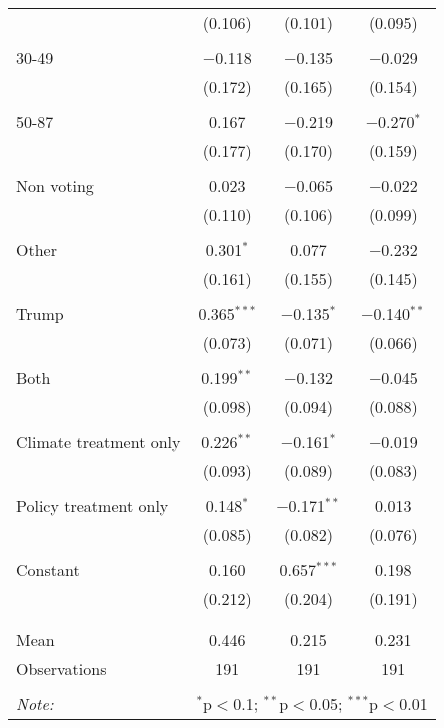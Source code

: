 \begin{tabular}{@{\extracolsep{5pt}}lccc}
  & (0.106) & (0.101) & (0.095) \\ 
  & & & \\ 
 30-49 & $-$0.118 & $-$0.135 & $-$0.029 \\ 
  & (0.172) & (0.165) & (0.154) \\ 
  & & & \\ 
 50-87 & 0.167 & $-$0.219 & $-$0.270$^{*}$ \\ 
  & (0.177) & (0.170) & (0.159) \\ 
  & & & \\ 
 Non voting & 0.023 & $-$0.065 & $-$0.022 \\ 
  & (0.110) & (0.106) & (0.099) \\ 
  & & & \\ 
 Other & 0.301$^{*}$ & 0.077 & $-$0.232 \\ 
  & (0.161) & (0.155) & (0.145) \\ 
  & & & \\ 
 Trump & 0.365$^{***}$ & $-$0.135$^{*}$ & $-$0.140$^{**}$ \\ 
  & (0.073) & (0.071) & (0.066) \\ 
  & & & \\ 
 Both & 0.199$^{**}$ & $-$0.132 & $-$0.045 \\ 
  & (0.098) & (0.094) & (0.088) \\ 
  & & & \\ 
 Climate treatment only & 0.226$^{**}$ & $-$0.161$^{*}$ & $-$0.019 \\ 
  & (0.093) & (0.089) & (0.083) \\ 
  & & & \\ 
 Policy treatment only & 0.148$^{*}$ & $-$0.171$^{**}$ & 0.013 \\ 
  & (0.085) & (0.082) & (0.076) \\ 
  & & & \\ 
 Constant & 0.160 & 0.657$^{***}$ & 0.198 \\ 
  & (0.212) & (0.204) & (0.191) \\ 
  & & & \\ 
\hline \\[-1.8ex] 
Mean & 0.446 & 0.215 & 0.231 \\ 
Observations & 191 & 191 & 191 \\ 
\hline 
\hline \\[-1.8ex] 
\textit{Note:}  & \multicolumn{3}{r}{$^{*}$p$<$0.1; $^{**}$p$<$0.05; $^{***}$p$<$0.01} \\ 
\end{tabular} 
